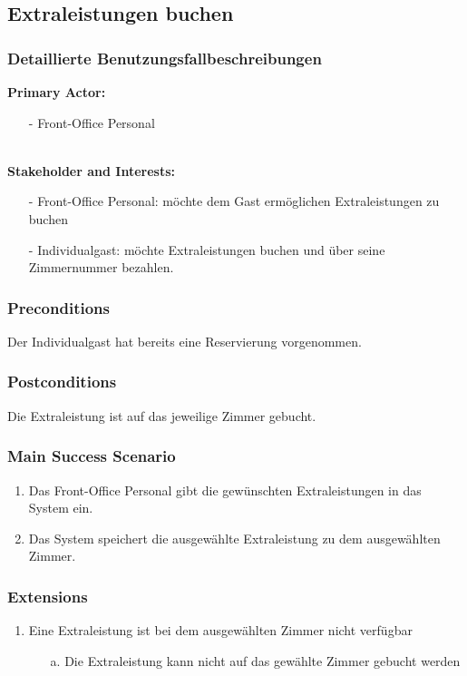 \documentclass[./detailed_overview_usecases.tex]{subfiles}
\begin{document}
    \subsection{Extraleistungen buchen}
    \subsubsection{Detaillierte Benutzungsfallbeschreibungen}
    \textbf{Primary Actor:}
    \begin{itemize}
        \item [-]  Front-Office Personal
    \end{itemize}
    \\
    \textbf{Stakeholder and Interests:}
    \begin{itemize}
        \item[-] Front-Office Personal: möchte dem Gast ermöglichen Extraleistungen zu buchen
        \item[-] Individualgast: möchte Extraleistungen buchen und über seine Zimmernummer bezahlen.
    \end{itemize}

    \subsubsection*{Preconditions}
    Der Individualgast hat bereits eine Reservierung vorgenommen.

    \subsubsection*{Postconditions}
    Die Extraleistung ist auf das jeweilige Zimmer gebucht.

    \subsubsection*{Main Success Scenario}
    \begin{enumerate}
        \item Das Front-Office Personal gibt die gewünschten Extraleistungen in das System ein.
        \item Das System speichert die ausgewählte Extraleistung zu dem ausgewählten Zimmer.
    \end{enumerate}

    \subsubsection*{Extensions}
    \begin{enumerate}
        \item Eine Extraleistung ist bei dem ausgewählten Zimmer nicht verfügbar
        \begin{itemize}
            \item[a.] Die Extraleistung kann nicht auf das gewählte Zimmer gebucht werden
        \end{itemize}
    \end{enumerate}
\end{document}
